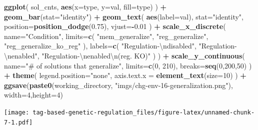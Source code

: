 \documentclass[
]{book}
\newenvironment{Shaded}{\begin{snugshade}}{\end{snugshade}}
\newcommand{\CharTok}[1]{\textcolor[rgb]{0.31,0.60,0.02}{#1}}
\newcommand{\DataTypeTok}[1]{\textcolor[rgb]{0.13,0.29,0.53}{#1}}
\newcommand{\DecValTok}[1]{\textcolor[rgb]{0.00,0.00,0.81}{#1}}
\newcommand{\FloatTok}[1]{\textcolor[rgb]{0.00,0.00,0.81}{#1}}
\newcommand{\KeywordTok}[1]{\textcolor[rgb]{0.13,0.29,0.53}{\textbf{#1}}}
\newcommand{\NormalTok}[1]{#1}
\newcommand{\OperatorTok}[1]{\textcolor[rgb]{0.81,0.36,0.00}{\textbf{#1}}}
\newcommand{\StringTok}[1]{\textcolor[rgb]{0.31,0.60,0.02}{#1}}
\begin{document}
\begin{Shaded}
\begin{Highlighting}[]
\KeywordTok{ggplot}\NormalTok{( sol\_cnts, }\KeywordTok{aes}\NormalTok{(}\DataTypeTok{x=}\NormalTok{type, }\DataTypeTok{y=}\NormalTok{val, }\DataTypeTok{fill=}\NormalTok{type) ) }\OperatorTok{+}
\StringTok{  }\KeywordTok{geom\_bar}\NormalTok{(}\DataTypeTok{stat=}\StringTok{"identity"}\NormalTok{) }\OperatorTok{+}
\StringTok{  }\KeywordTok{geom\_text}\NormalTok{(}
    \KeywordTok{aes}\NormalTok{(}\DataTypeTok{label=}\NormalTok{val),}
    \DataTypeTok{stat=}\StringTok{"identity"}\NormalTok{,}
    \DataTypeTok{position=}\KeywordTok{position\_dodge}\NormalTok{(}\FloatTok{0.75}\NormalTok{),}
    \DataTypeTok{vjust=}\OperatorTok{{-}}\FloatTok{0.01}
\NormalTok{  ) }\OperatorTok{+}
\StringTok{  }\KeywordTok{scale\_x\_discrete}\NormalTok{(}
    \DataTypeTok{name=}\StringTok{"Condition"}\NormalTok{,}
    \DataTypeTok{limits=}\KeywordTok{c}\NormalTok{(}
      \StringTok{"mem\_generalize"}\NormalTok{,}
      \StringTok{"reg\_generalize"}\NormalTok{,}
      \StringTok{"reg\_generalize\_ko\_reg"}
\NormalTok{      ),}
    \DataTypeTok{labels=}\KeywordTok{c}\NormalTok{(}
      \StringTok{"Regulation{-}}\CharTok{\textbackslash{}n}\StringTok{disabled"}\NormalTok{,}
      \StringTok{"Regulation{-}}\CharTok{\textbackslash{}n}\StringTok{enabled"}\NormalTok{,}
      \StringTok{"Regulation{-}}\CharTok{\textbackslash{}n}\StringTok{enabled}\CharTok{\textbackslash{}n}\StringTok{(reg. KO)"}
\NormalTok{    )}
\NormalTok{  ) }\OperatorTok{+}
\StringTok{  }\KeywordTok{scale\_y\_continuous}\NormalTok{(}
    \DataTypeTok{name=}\StringTok{"\# of solutions that generalize"}\NormalTok{,}
    \DataTypeTok{limits=}\KeywordTok{c}\NormalTok{(}\DecValTok{0}\NormalTok{, }\DecValTok{210}\NormalTok{),}
    \DataTypeTok{breaks=}\KeywordTok{seq}\NormalTok{(}\DecValTok{0}\NormalTok{,}\DecValTok{200}\NormalTok{,}\DecValTok{50}\NormalTok{)}
\NormalTok{  ) }\OperatorTok{+}
\StringTok{  }\KeywordTok{theme}\NormalTok{(}
    \DataTypeTok{legend.position=}\StringTok{"none"}\NormalTok{,}
    \DataTypeTok{axis.text.x =} \KeywordTok{element\_text}\NormalTok{(}\DataTypeTok{size=}\DecValTok{10}\NormalTok{)}
\NormalTok{  ) }\OperatorTok{+}
\StringTok{  }\KeywordTok{ggsave}\NormalTok{(}\KeywordTok{paste0}\NormalTok{(working\_directory, }\StringTok{"imgs/chg{-}env{-}16{-}generalization.png"}\NormalTok{), }\DataTypeTok{width=}\DecValTok{4}\NormalTok{,}\DataTypeTok{height=}\DecValTok{4}\NormalTok{)}
\end{Highlighting}
\end{Shaded}

\texttt{[image: tag-based-genetic-regulation\_files/figure-latex/unnamed-chunk-7-1.pdf]}
\end{document}
